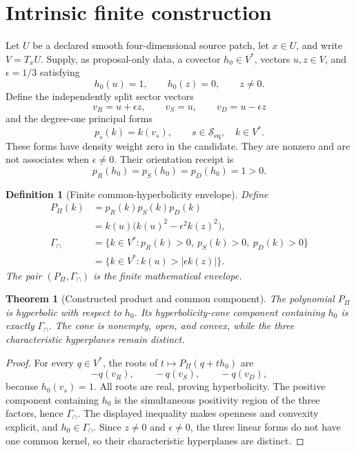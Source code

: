 \documentclass[11pt]{article}
\newtheorem{definition}{Definition}
\newtheorem{theorem}{Theorem}
\newcommand{\Seq}{\mathcal S_{\mathrm{eq}}}
\newcommand{\Pprod}{P_{\Pi}}
\newcommand{\GammaInt}{\Gamma_{\cap}}
\begin{document}
\section{Intrinsic finite construction}

Let \(U\) be a declared smooth four-dimensional source patch, let
\(x\in U\), and write \(V=T_xU\).  Supply, as proposal-only data, a covector
\(h_0\in V^*\), vectors \(u,z\in V\), and
\(\epsilon=1/3\) satisfying
\[
 h_0(u)=1,\qquad h_0(z)=0,\qquad z\ne0.
\]
Define the independently split sector vectors
\[
 v_R=u+\epsilon z,\qquad v_S=u,\qquad v_D=u-\epsilon z
\]
and the degree-one principal forms
\[
 p_s(k)=k(v_s),\qquad s\in\Seq,\quad k\in V^*.
\]
These forms have density weight zero in the candidate.  They are nonzero and
are not associates when \(\epsilon\ne0\).  Their orientation receipt is
\[
 p_R(h_0)=p_S(h_0)=p_D(h_0)=1>0.
\]

\begin{definition}[Finite common-hyperbolicity envelope]
Define
\begin{align}
 \Pprod(k)
   &=p_R(k)p_S(k)p_D(k) \\
   &=k(u)\bigl(k(u)^2-\epsilon^2 k(z)^2\bigr), \\
 \GammaInt
   &=\{k\in V^*:p_R(k)>0,\ p_S(k)>0,\ p_D(k)>0\} \\
   &=\{k\in V^*:k(u)>|\epsilon k(z)|\}.
\end{align}
The pair \((\Pprod,\GammaInt)\) is the finite mathematical envelope.
\end{definition}

\begin{theorem}[Constructed product and common component]
\label{thm:product}
The polynomial \(\Pprod\) is hyperbolic with respect to \(h_0\).  Its
hyperbolicity-cone component containing \(h_0\) is exactly \(\GammaInt\).
The cone is nonempty, open, and convex, while the three characteristic
hyperplanes remain distinct.
\end{theorem}

\begin{proof}
For every \(q\in V^*\), the roots of
\(t\mapsto\Pprod(q+t h_0)\) are
\[
 -q(v_R),\qquad -q(v_S),\qquad -q(v_D),
\]
because \(h_0(v_s)=1\).  All roots are real, proving hyperbolicity.  The
positive component containing \(h_0\) is the simultaneous positivity region
of the three factors, hence \(\GammaInt\).  The displayed inequality makes
openness and convexity explicit, and \(h_0\in\GammaInt\).  Since
\(z\ne0\) and \(\epsilon\ne0\), the three linear forms do not have one common
kernel, so their characteristic hyperplanes are distinct.
\end{proof}
\end{document}
